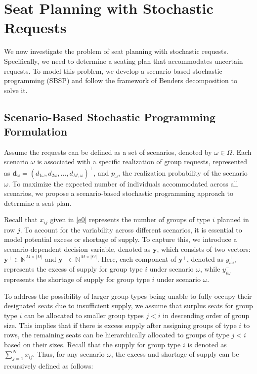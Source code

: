 
\section{Seat Planning with Stochastic Requests}\label{sec_seat_planning}
We now investigate the problem of seat planning with stochastic requests. Specifically, we need to determine a seating plan that accommodates uncertain requests. To model this problem, we develop a scenario-based stochastic programming (SBSP) and follow the framework of Benders decomposition to solve it. %


\subsection{Scenario-Based Stochastic Programming Formulation}
Assume the requests can be defined as a set of scenarios, denoted by  $\omega \in \Omega$. Each scenario $\omega$ is associated with a specific realization of group requests, represented as $\mathbf{d}_\omega = (d_{1\omega},d_{2\omega},\ldots,d_{M,\omega})^{\intercal}$, and  $p_{\omega}$, the realization probability of the scenario $\omega$. To maximize the expected number of individuals accommodated across all scenarios, we propose a scenario-based stochastic programming approach to determine a seat plan.

Recall that $x_{ij}$ given in \eqref{e0} represents the number of groups of type $i$ planned in row $j$. To account for the variability across different scenarios, it is essential to model potential excess or shortage of supply. To capture this, we introduce a scenario-dependent decision variable, denoted as $\mathbf{y}$, which consists of two vectors: $\mathbf{y}^{+} \in \mathbb{N}^{M \times |\Omega|}$ and $\mathbf{y}^{-} \in \mathbb{N}^{M \times |\Omega|}$. Here, each component of $\mathbf{y}^{+}$, denoted as $y_{i\omega}^{+}$, represents the excess of supply for group type $i$ under scenario $\omega$, while $y_{i\omega}^{-}$ represents the shortage of supply for group type $i$ under scenario $\omega$.

To address the possibility of larger group types being unable to fully occupy their designated seats due to insufficient supply, we assume that surplus seats for group type $i$ can be 
allocated to smaller group types $j<i$ in descending order of group size. This implies that if there is excess supply after assigning groups of type $i$ to rows, the remaining seats can be hierarchically allocated to groups of type $j<i$ based on their sizes. Recall that the supply for group type $i$ is denoted as $\sum_{j=1}^N x_{ij}$. Thus, for any scenario $\omega$, the excess and shortage of supply can be recursively defined as follows:

